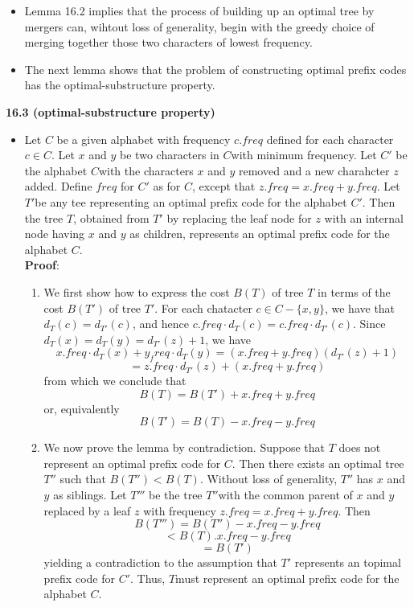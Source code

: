 \documentclass{report}
\begin{document}
\begin{itemize}
\begin{enumerate}
    \end{enumerate}
    \item Lemma 16.2 implies that the process of building up an optimal tree by mergers can, wihtout loss of generality, begin with the greedy choice of merging together those two characters of lowest frequency.
    \item The next lemma shows that the problem of constructing optimal prefix codes has the optimal-substructure property.
\end{itemize}
\textbf{16.3 (optimal-substructure property)}
\begin{itemize}
    \item Let $C$ be a given alphabet with frequency $c.freq$ defined for each character $c \in C$. Let $x$ and $y$ be two characters in $C$with minimum frequency. Let $C'$ be the alphabet $C$with the characters $x$ and $y$ removed and a new charahcter $z$ added. Define $freq$ for $C'$ as for $C$, except that $z.freq = x.freq + y.freq$. Let $T'$be any tee representing an optimal prefix code for the alphabet $C'$. Then the tree $T$, obtained from $T'$ by replacing the leaf node for $z$ with an internal node having $x$ and $y$ as children, represents an optimal prefix code for the alphabet $C$. \\
    \textbf{Proof}:
    \begin{enumerate}
        \item We first show how to express the cost $B(T)$ of tree $T$ in terms of the cost $B(T')$ of tree $T'$. For each chatacter $c \in C - \{x, y\}$, we have that $d_T(c) = d_{T'}(c)$, and hence $c.freq \cdot d_T(c) = c.freq \cdot d_{T'}(c)$. Since $d_T(x) = d_T(y) = d_{T'}(z) + 1$, we have 
        $$x.freq \cdot d_T(x) + y_freq \cdot d_T(y) = (x.freq + y.freq)(d_{T'}(z) + 1)$$
        $$ = z.freq \cdot d_{T'}(z) + (x.freq + y.freq)$$
        from which we conclude that  
        $$B(T) = B(T') + x.freq + y.freq$$
        or, equivalently
        $$B(T') = B(T) - x.freq - y.freq$$
        \item We now prove the lemma by contradiction. Suppose that $T$ does not represent an optimal prefix code for $C$. Then there exists an optimal tree $T''$ such that $B(T'') < B(T)$. Without loss of generality, $T''$ has $x$ and $y$ as siblings. Let $T'''$ be the tree $T''$with the common parent of $x$ and $y$ replaced by a leaf $z$ with frequency $z.freq = x.freq + y.freq$. Then
        $$B(T''') = B(T'') - x.freq - y.freq$$
        $$ < B(T) . x.freq - y.freq$$
        $$ = B(T')$$
        yielding a contradiction to the assumption that $T'$ represents an topimal prefix code for $C'$. Thus, $T$must represent an optimal prefix code for the alphabet $C$.
    \end{enumerate}
\end{itemize}
\end{document}
